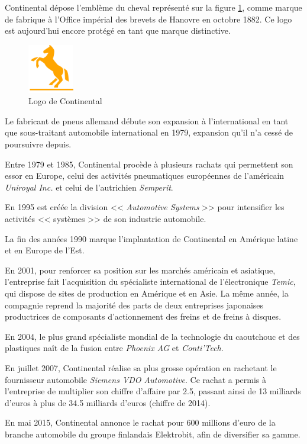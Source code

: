 Continental dépose l'emblème du cheval représenté sur la figure \ref{fig:logo}, comme marque de fabrique à l'Office impérial des brevets de Hanovre en octobre 1882. Ce logo est aujourd'hui encore protégé en tant que marque distinctive.
\begin{figure}[H]
	\centering
	\includegraphics[width=2cm]{contents/images/logoConti.png}
	\caption{Logo de Continental}
	\label{fig:logo}
\end{figure}

Le fabricant de pneus allemand débute son expansion à l'international en tant que sous-traitant automobile international en 1979, expansion qu'il n'a cessé de poursuivre depuis.

Entre 1979 et 1985, Continental procède à plusieurs rachats qui permettent son essor en Europe, celui des activités pneumatiques européennes de l'américain \textit{Uniroyal Inc.} et celui de l'autrichien \textit{Semperit}.

En 1995 est créée la division << \textit{Automotive Systems} >> pour intensifier les activités << systèmes >> de son industrie automobile.

La fin des années 1990 marque l'implantation de Continental en Amérique latine et en Europe de l'Est.

En 2001, pour renforcer sa position sur les marchés américain et asiatique, l'entreprise fait l'acquisition du spécialiste international de l'électronique \textit{Temic}, qui dispose de sites de production en Amérique et en Asie. La même année, la compagnie reprend la majorité des parts de deux entreprises japonaises productrices de composants d'actionnement des freins et de freins à disques. 

En 2004, le plus grand spécialiste mondial de la technologie du caoutchouc et des plastiques naît de la fusion entre \textit{Phoenix AG} et \textit{Conti'Tech}.

En juillet 2007, Continental réalise sa plus grosse opération en rachetant le fournisseur automobile \textit{Siemens VDO Automotive}. Ce rachat a permis à l'entreprise de multiplier son chiffre d'affaire par 2.5, passant ainsi de 13 milliards d'euros à plus de 34.5 milliards d'euros (chiffre de 2014).

En mai 2015, Continental annonce le rachat pour 600 millions d'euro de la branche automobile du groupe finlandais Elektrobit, afin de diversifier sa gamme.

